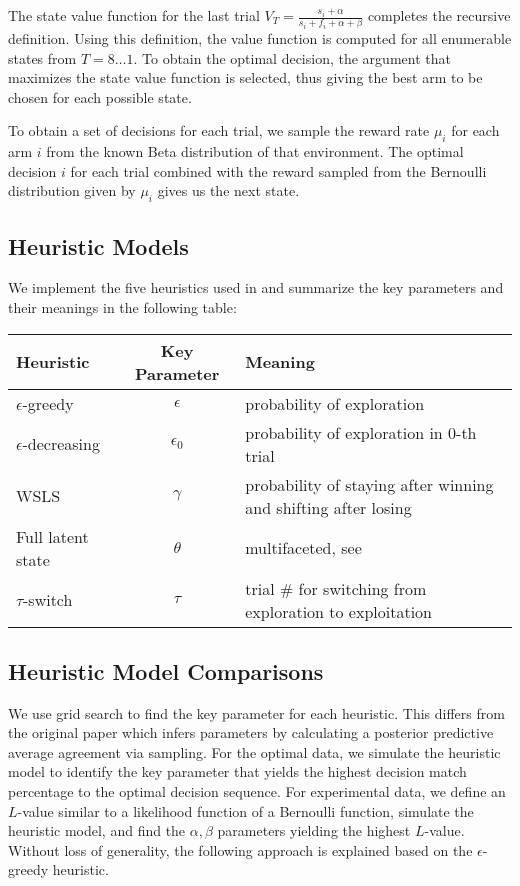 The state value function for the last trial $V_T=\frac{s_i + \alpha}{s_i + f_i + \alpha + \beta}$ completes the recursive definition. Using this definition, the value function is computed for all enumerable states from $T=8\ldots1$. To obtain the optimal decision, the argument that maximizes the state value function is selected, thus giving the best arm to be chosen for each possible state. 

To obtain a set of decisions for each trial, we sample the reward rate $\mu_i$ for each arm $i$ from the known Beta distribution of that environment. The optimal decision $i$ for each trial combined with the reward sampled from the Bernoulli distribution given by $\mu_i$ gives us the next state.

\subsection{Heuristic Models}
We implement the five heuristics used in \cite{shunan2011} and summarize the key parameters and their meanings in the following table: 

\begin{table}[h]
\begin{tabular}{|l|c|l|}
\hline
\textbf{Heuristic} & \textbf{Key Parameter} & \textbf{Meaning} \\ \hline
$\epsilon$-greedy & $\epsilon$ & probability of exploration \\ \hline
$\epsilon$-decreasing & $\epsilon_0$ & probability of exploration in 0-th trial \\ \hline
WSLS & $\gamma$ & probability of staying after winning and shifting after losing \\ \hline
Full latent state & $\theta$ & multifaceted, see \cite{shunan2009} \\ \hline
$\tau$-switch & $\tau$ & trial \# for switching from exploration to exploitation \\ \hline
\end{tabular}
\end{table}

\subsection{Heuristic Model Comparisons}
We use grid search to find the key parameter for each heuristic. This differs from the original paper which infers parameters by calculating a posterior predictive average agreement via sampling. For the optimal data, we simulate the heuristic model to identify the key parameter that yields the highest decision match percentage to the optimal decision sequence. For experimental data, we define an $L$-value similar to a likelihood function of a Bernoulli function, simulate the heuristic model, and find the $\alpha,\beta$ parameters yielding the highest $L$-value. Without loss of generality, the following approach is explained based on the $\epsilon$-greedy heuristic. 

